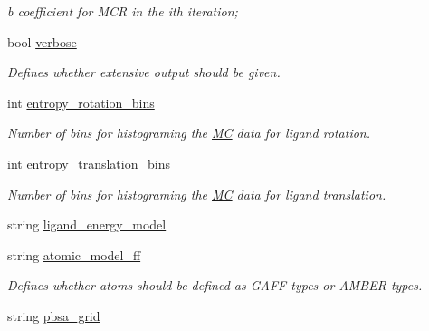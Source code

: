 \begin{DoxyCompactItemize}
\begin{DoxyCompactList}\small\item\em b coefficient for MCR in the ith iteration; \item\end{DoxyCompactList}\item 
\hypertarget{classPARSER_ac10edf434b48ccd7b4afb63bea264be0}{
bool \hyperlink{classPARSER_ac10edf434b48ccd7b4afb63bea264be0}{verbose}}
\label{classPARSER_ac10edf434b48ccd7b4afb63bea264be0}

\begin{DoxyCompactList}\small\item\em Defines whether extensive output should be given. \item\end{DoxyCompactList}\item 
\hypertarget{classPARSER_a41e566fb857232936bab1b70aff18419}{
int \hyperlink{classPARSER_a41e566fb857232936bab1b70aff18419}{entropy\_\-rotation\_\-bins}}
\label{classPARSER_a41e566fb857232936bab1b70aff18419}

\begin{DoxyCompactList}\small\item\em Number of bins for histograming the \hyperlink{classMC}{MC} data for ligand rotation. \item\end{DoxyCompactList}\item 
\hypertarget{classPARSER_a9dbf30db599861b8cb6931a69c6b8d4b}{
int \hyperlink{classPARSER_a9dbf30db599861b8cb6931a69c6b8d4b}{entropy\_\-translation\_\-bins}}
\label{classPARSER_a9dbf30db599861b8cb6931a69c6b8d4b}

\begin{DoxyCompactList}\small\item\em Number of bins for histograming the \hyperlink{classMC}{MC} data for ligand translation. \item\end{DoxyCompactList}\item 
string \hyperlink{classPARSER_a0a43b6648c3d3178e2a300750e91eee2}{ligand\_\-energy\_\-model}
\item 
\hypertarget{classPARSER_a0e6b81780fb84de567c15a8a3604281a}{
string \hyperlink{classPARSER_a0e6b81780fb84de567c15a8a3604281a}{atomic\_\-model\_\-ff}}
\label{classPARSER_a0e6b81780fb84de567c15a8a3604281a}

\begin{DoxyCompactList}\small\item\em Defines whether atoms should be defined as GAFF types or AMBER types. \item\end{DoxyCompactList}\item 
\hypertarget{classPARSER_a52ff2cfc274eb788806278035b3b5e55}{
string \hyperlink{classPARSER_a52ff2cfc274eb788806278035b3b5e55}{pbsa\_\-grid}}
\label{classPARSER_a52ff2cfc274eb788806278035b3b5e55}


\end{DoxyCompactItemize}
